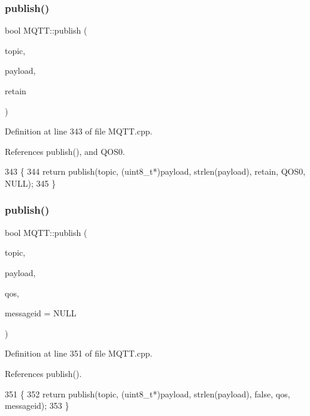 \subsubsection{publish()\hspace{0.1cm}{\footnotesize\ttfamily [2/10]}}
{\footnotesize\ttfamily bool M\+Q\+T\+T\+::publish (\begin{DoxyParamCaption}\item[{const char $\ast$}]{topic,  }\item[{const char $\ast$}]{payload,  }\item[{bool}]{retain }\end{DoxyParamCaption})}



Definition at line 343 of file M\+Q\+T\+T.\+cpp.



References publish(), and Q\+O\+S0.


\begin{DoxyCode}
343                                                                       \{
344     \textcolor{keywordflow}{return} publish(topic, (uint8\_t*)payload, strlen(payload), retain, QOS0, NULL);
345 \}
\end{DoxyCode}
\mbox{\label{class_m_q_t_t_ae9321f0f8b365eaf32c87706273cb473}} 
\subsubsection{publish()\hspace{0.1cm}{\footnotesize\ttfamily [3/10]}}
{\footnotesize\ttfamily bool M\+Q\+T\+T\+::publish (\begin{DoxyParamCaption}\item[{const char $\ast$}]{topic,  }\item[{const char $\ast$}]{payload,  }\item[{\textbf{ E\+M\+Q\+T\+T\+\_\+\+Q\+OS}}]{qos,  }\item[{uint16\+\_\+t $\ast$}]{messageid = {\ttfamily NULL} }\end{DoxyParamCaption})}



Definition at line 351 of file M\+Q\+T\+T.\+cpp.



References publish().


\begin{DoxyCode}
351                                                                                               \{
352     \textcolor{keywordflow}{return} publish(topic, (uint8\_t*)payload, strlen(payload), \textcolor{keyword}{false}, qos, messageid);
353 \}
\end{DoxyCode}
\mbox{\label{class_m_q_t_t_abd5a453777652cd30ae3cfc4df4aa376}} 
